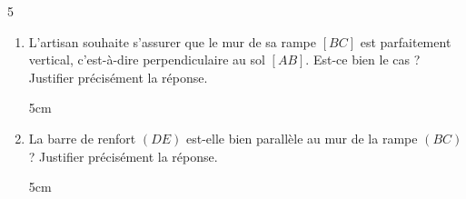 \documentclass[a4paper]{book}
\begin{document}
{\begin{exerciceNote}{5}
\begin{minipage}{0.49\linewidth}
\begin{center}
            \end{center}
        \end{minipage}      
        
        \medskip
    
        \begin{enumerate}
            \item L'artisan souhaite s'assurer que le mur de sa rampe $[BC]$ est parfaitement vertical, c'est-à-dire perpendiculaire au sol $[AB]$. Est-ce bien le cas ? Justifier précisément la réponse.
            
            \begin{ZoneReponse}{5cm}
            \end{ZoneReponse}
            
            \item La barre de renfort $(DE)$ est-elle bien parallèle au mur de la rampe $(BC)$ ? Justifier précisément la réponse.
            
            \begin{ZoneReponse}{5cm}
            \end{ZoneReponse}
        \end{enumerate}
    \end{exerciceNote}
}
\end{document}
